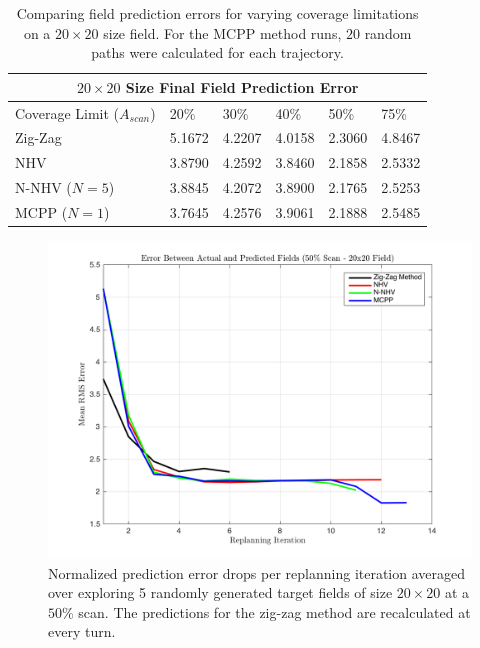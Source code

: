 \begin{table}[ht!]
\centering
	\begin{tabular}{ |p{3cm}||p{1cm}|p{1cm}|p{1cm}|p{1cm}|p{1cm}|  }
		\hline
		\multicolumn{6}{|c|}{$20 \times 20$ Size Final Field Prediction Error} \\
		\hline
		Coverage Limit ($A_{scan}$) & 20\% & 30\% & 40\% & 50\% & 75\% \\
		\hline
		Zig-Zag        & 5.1672 & 4.2207 & 4.0158 & 2.3060 & 4.8467 \\
		NHV            & 3.8790 & 4.2592 & 3.8460 & 2.1858 & 2.5332 \\
		N-NHV ($N=5$)  & 3.8845 & 4.2072 & 3.8900 & 2.1765 & 2.5253 \\
		MCPP  ($N=1$)  & 3.7645 & 4.2576 & 3.9061 & 2.1888 & 2.5485 \\
		\hline
	\end{tabular}
	\caption{Comparing field prediction errors for varying coverage limitations on a $20 \times 20$ size field. For the MCPP method runs, $20$ random paths were calculated for each trajectory.}
    \label{tab:20fieldprederr}
\end{table}

\begin{figure}[hb!]
	\centering
	\includegraphics[width=0.8\linewidth]{figures/pred_error_20x20_50percent_5runs.png}
    \captionsetup{skip=0.20\baselineskip,size=footnotesize}
	\caption{Normalized prediction error drops per replanning iteration averaged over exploring 5 randomly generated target fields of size $20 \times 20$ at a $50\%$ scan. The predictions for the zig-zag method are recalculated at every turn.}
\end{figure}

